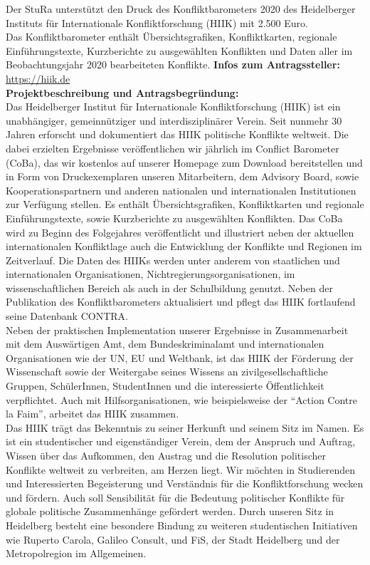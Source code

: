 {
    Der StuRa unterstützt den Druck des Konfliktbarometers 2020 des Heidelberger Instituts für Internationale Konfliktforschung (HIIK) mit 2.500 Euro.\\
    Das Konfliktbarometer enthält Übersichtsgrafiken, Konfliktkarten, regionale Einführungstexte, Kurzberichte zu ausgewählten Konflikten und Daten aller im Beobachtungsjahr 2020 bearbeiteten Konflikte.
}{
    \textbf{Infos zum Antragssteller:}\\
    \url{https://hiik.de}\\[1em]
    \textbf{Projektbeschreibung und Antragsbegründung:}\\
    Das Heidelberger Institut für Internationale Konfliktforschung (HIIK) ist ein unabhängiger, gemeinnütziger und interdisziplinärer Verein. Seit nunmehr 30 Jahren erforscht und dokumentiert das HIIK politische Konflikte weltweit. Die dabei erzielten Ergebnisse veröffentlichen wir jährlich im Conflict Barometer (CoBa), das wir kostenlos auf unserer Homepage zum Download bereitstellen und in Form von Druckexemplaren unseren Mitarbeitern, dem Advisory Board, sowie Kooperationspartnern und anderen nationalen und internationalen Institutionen zur Verfügung stellen. Es enthält Übersichtsgrafiken, Konfliktkarten und regionale Einführungstexte, sowie Kurzberichte zu ausgewählten Konflikten. Das CoBa wird zu Beginn des Folgejahres veröffentlicht und illustriert neben der aktuellen internationalen Konfliktlage auch die Entwicklung der Konflikte und Regionen im Zeitverlauf. Die Daten des HIIKs werden unter anderem von staatlichen und internationalen Organisationen, Nichtregierungsorganisationen, im wissenschaftlichen Bereich als auch in der Schulbildung genutzt. Neben der Publikation des Konfliktbarometers aktualisiert und pflegt das HIIK fortlaufend seine Datenbank CONTRA.\\
    Neben der praktischen Implementation unserer Ergebnisse in Zusammenarbeit mit dem Auswärtigen Amt, dem Bundeskriminalamt und internationalen Organisationen wie der UN, EU und Weltbank, ist das HIIK der Förderung der Wissenschaft sowie der Weitergabe seines Wissens an zivilgesellschaftliche Gruppen, SchülerInnen, StudentInnen und die interessierte Öffentlichkeit verpflichtet. Auch mit Hilfsorganisationen, wie beispielsweise der “Action Contre la Faim”, arbeitet das HIIK zusammen.\\
    Das HIIK trägt das Bekenntnis zu seiner Herkunft und seinem Sitz im Namen. Es ist ein studentischer und eigenständiger Verein, dem der Anspruch und Auftrag, Wissen über das Aufkommen, den Austrag und die Resolution politischer Konflikte weltweit zu verbreiten, am Herzen liegt. Wir möchten in Studierenden und Interessierten Begeisterung und Verständnis für die Konfliktforschung wecken und fördern. Auch soll Sensibilität für die Bedeutung politischer Konflikte für globale politische Zusammenhänge gefördert werden. Durch unseren Sitz in Heidelberg besteht eine besondere Bindung zu weiteren studentischen Initiativen wie Ruperto Carola, Galileo Consult, und FiS, der Stadt Heidelberg und der Metropolregion im Allgemeinen.\\
}
